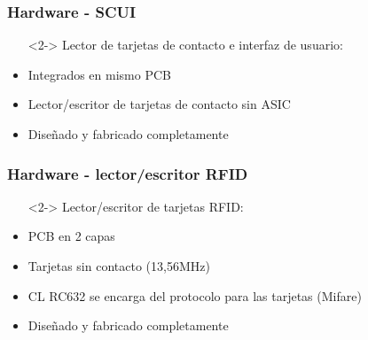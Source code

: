 \documentclass{beamer}
\begin{document}
\begin{frame}
	\frametitle{Hardware - SCUI}
	\begin{itemize}
		\item[] <2-> Lector de tarjetas de contacto e interfaz de usuario:
	\end{itemize}
	\begin{figure}
	\end{figure}

	\begin{itemize}
		\item <3-> Integrados en mismo PCB
		
		\bigskip		
		\item <4-> Lector/escritor de tarjetas de contacto sin ASIC

		\bigskip
		\item <5-> Diseñado y fabricado completamente
	\end{itemize}
\end{frame}

\begin{frame}
	\frametitle{Hardware - lector/escritor RFID}
	\begin{itemize}
		\item[]	<2-> Lector/escritor de tarjetas RFID:
	\end{itemize}
	\begin{figure}
	\end{figure}

	\begin{itemize}
		\item <3-> PCB en 2 capas

		\bigskip
		\item <4-> Tarjetas sin contacto (13,56MHz)

		\bigskip
		\item <5-> CL RC632 se encarga del protocolo para las tarjetas (Mifare)

		\bigskip
		\item <6-> Diseñado y fabricado completamente
	\end{itemize}
\end{frame}
\end{document}
